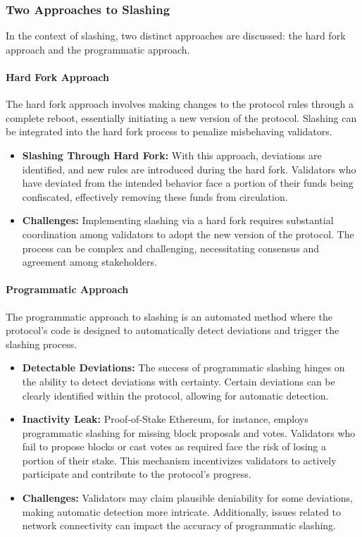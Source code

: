\subsubsection{Two Approaches to Slashing}
In the context of slashing, two distinct approaches are discussed: the hard fork approach and the programmatic approach.

\paragraph{Hard Fork Approach}
The hard fork approach involves making changes to the protocol rules through a complete reboot, essentially initiating a new version of the protocol. Slashing can be integrated into the hard fork process to penalize misbehaving validators.

\begin{itemize}
  \item \textbf{Slashing Through Hard Fork:} With this approach, deviations are identified, and new rules are introduced during the hard fork. Validators who have deviated from the intended behavior face a portion of their funds being confiscated, effectively removing these funds from circulation.
  
  \item \textbf{Challenges:} Implementing slashing via a hard fork requires substantial coordination among validators to adopt the new version of the protocol. The process can be complex and challenging, necessitating consensus and agreement among stakeholders.
\end{itemize}

\paragraph{Programmatic Approach}
The programmatic approach to slashing is an automated method where the protocol's code is designed to automatically detect deviations and trigger the slashing process.

\begin{itemize}
  \item \textbf{Detectable Deviations:} The success of programmatic slashing hinges on the ability to detect deviations with certainty. Certain deviations can be clearly identified within the protocol, allowing for automatic detection.
  
  \item \textbf{Inactivity Leak:} Proof-of-Stake Ethereum, for instance, employs programmatic slashing for missing block proposals and votes. Validators who fail to propose blocks or cast votes as required face the risk of losing a portion of their stake. This mechanism incentivizes validators to actively participate and contribute to the protocol's progress.
  
  \item \textbf{Challenges:} Validators may claim plausible deniability for some deviations, making automatic detection more intricate. Additionally, issues related to network connectivity can impact the accuracy of programmatic slashing.
\end{itemize}

